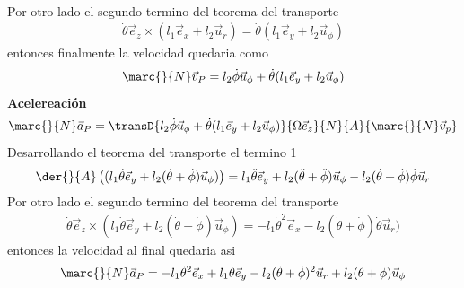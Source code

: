 \begin{tcolorbox}[title=Solucion,breakable]
\begin{align}
        \end{align}
        Por otro lado el segundo termino del teorema del transporte
        \begin{align}
            \dot\theta\vec{e}_z\times (l_1\vec{e}_x+l_2\vec{u}_r)=\dot\theta(l_1\vec{e}_y+l_2\vec{u}_\phi)
        \end{align}
        entonces finalmente la velocidad quedaria como
        $$\marc{}{N}\vec{v}_P=l_2\dot\phi\vec{u}_\phi+\dot\theta(l_1\vec{e}_y+l_2\vec{u}_\phi)$$
    \textbf{Acelereación}\\
    \begin{equation}
            \marc{}{N}\vec{a}_P=\transD{l_2\dot\phi\vec{u}_\phi+\dot\theta(l_1\vec{e}_y+l_2\vec{u}_\phi)}{\Omega\vec{e}_z}{N}{A}{\marc{}{N}\vec{v}_p}
        \end{equation}
        Desarrollando el teorema del transporte el termino 1
        \begin{align}
            \der{}{A}\left((l_1\dot\theta\vec{e}_y+l_2(\dot\theta+\dot\phi)\vec{u}_\phi)\right)=l_1\ddot\theta\vec{e}_y+l_2(\ddot\theta+\ddot\phi)\vec{u}_\phi-l_2(\dot\theta+\dot\phi)\dot\phi\vec{u}_r
        \end{align}
        Por otro lado el segundo termino del teorema del transporte
        \begin{align}
            \dot \theta\vec{e}_z\times(l_1\dot\theta\vec{e}_y+l_2(\dot\theta+\dot\phi)\vec{u}_\phi)=-l_1\dot\theta^2\vec{e}_x-l_2(\dot\theta+\dot\phi)\dot\theta\vec{u}_r)
        \end{align}
        entonces la velocidad al final quedaria asi
        $$\marc{}{N}\vec{a}_P = -l_1 \dot{\theta}^2 \vec{e}_x + l_1 \ddot{\theta} \vec{e}_y - l_2 (\dot{\theta} + \dot{\phi})^2 \vec{u}_r + l_2 (\ddot{\theta} + \ddot{\phi}) \vec{u}_\phi$$
\end{tcolorbox}